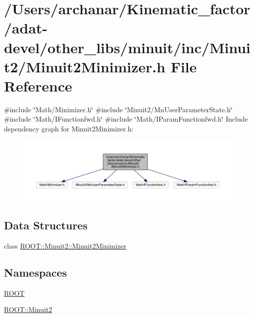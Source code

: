 \hypertarget{adat-devel_2other__libs_2minuit_2inc_2Minuit2_2Minuit2Minimizer_8h}{}\section{/\+Users/archanar/\+Kinematic\+\_\+factor/adat-\/devel/other\+\_\+libs/minuit/inc/\+Minuit2/\+Minuit2\+Minimizer.h File Reference}
\label{adat-devel_2other__libs_2minuit_2inc_2Minuit2_2Minuit2Minimizer_8h}
{\ttfamily \#include \char`\"{}Math/\+Minimizer.\+h\char`\"{}}\newline
{\ttfamily \#include \char`\"{}Minuit2/\+Mn\+User\+Parameter\+State.\+h\char`\"{}}\newline
{\ttfamily \#include \char`\"{}Math/\+I\+Functionfwd.\+h\char`\"{}}\newline
{\ttfamily \#include \char`\"{}Math/\+I\+Param\+Functionfwd.\+h\char`\"{}}\newline
Include dependency graph for Minuit2\+Minimizer.\+h\+:
\nopagebreak
\begin{figure}[H]
\begin{center}
\leavevmode
\includegraphics[width=350pt]{d7/de9/adat-devel_2other__libs_2minuit_2inc_2Minuit2_2Minuit2Minimizer_8h__incl}
\end{center}
\end{figure}
\subsection*{Data Structures}
\begin{DoxyCompactItemize}
\item 
class \mbox{\hyperlink{classROOT_1_1Minuit2_1_1Minuit2Minimizer}{R\+O\+O\+T\+::\+Minuit2\+::\+Minuit2\+Minimizer}}
\end{DoxyCompactItemize}
\subsection*{Namespaces}
\begin{DoxyCompactItemize}
\item 
 \mbox{\hyperlink{namespaceROOT}{R\+O\+OT}}
\item 
 \mbox{\hyperlink{namespaceROOT_1_1Minuit2}{R\+O\+O\+T\+::\+Minuit2}}
\end{DoxyCompactItemize}
